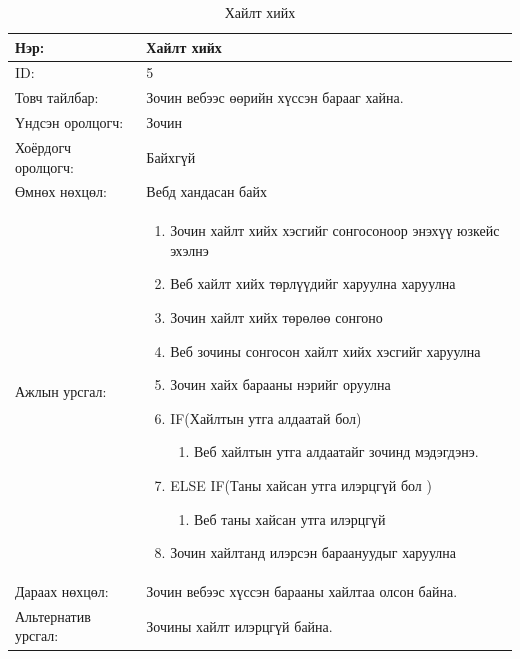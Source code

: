 \begin{center}
	\begin{table}[!htbp]
		\caption{Хайлт хийх } 
		\begin{tabular}{|p{4cm}|p{11cm}|}
			\hline
			Нэр: & Хайлт хийх  \\
			\hline
			ID: & 5 \\
			\hline
			Товч тайлбар: & Зочин вебээс өөрийн хүссэн барааг хайна.  \\
			\hline
			Үндсэн оролцогч: & Зочин \\
			\hline
			Хоёрдогч оролцогч: & Байхгүй  \\
			\hline
			Өмнөх нөхцөл: &  Вебд хандасан байх \\
			\hline
			Ажлын урсгал: & \begin{enumerate}
								\item Зочин хайлт хийх хэсгийг сонгосоноор энэхүү юзкейс эхэлнэ
								\item Веб хайлт хийх төрлүүдийг харуулна харуулна
								\item Зочин хайлт хийх төрөлөө сонгоно
								\item Веб зочины сонгосон хайлт хийх хэсгийг харуулна
								\item Зочин хайх барааны нэрийг оруулна
								\item IF(Хайлтын утга алдаатай бол)
									\begin{enumerate}
										\item[6.1] Веб хайлтын утга алдаатайг зочинд мэдэгдэнэ.
									\end{enumerate}	
								\item ELSE IF(Таны хайсан утга илэрцгүй бол )
									\begin{enumerate}
										\item[7.1] Веб таны хайсан утга илэрцгүй 
									\end{enumerate}
								\item Зочин хайлтанд илэрсэн бараануудыг  харуулна
							\end{enumerate} 	\\
						\hline
			Дараах нөхцөл: & Зочин вебээс хүссэн барааны хайлтаа олсон байна. \\
			\hline
			Альтернатив урсгал: & Зочины хайлт илэрцгүй байна.\\
			\hline
		\end{tabular}
	\end{table}
\end{center}

